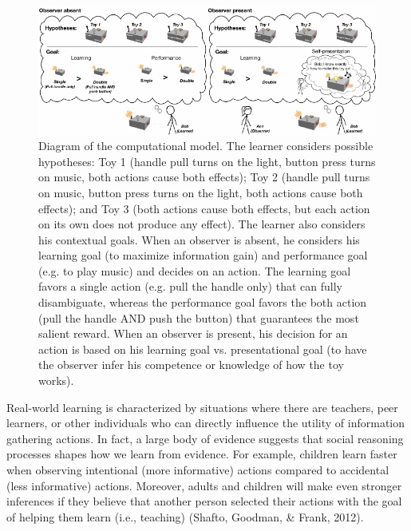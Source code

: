 \documentclass[10pt, letterpaper]{article}
\newenvironment{CodeChunk}{}{}
\begin{document}
\begin{CodeChunk}
\begin{figure}[tb]

{\centering \includegraphics[width=0.95\linewidth]{figs/model_diagram-1} 

}

\caption[Diagram of the computational model]{Diagram of the computational model. The learner considers possible hypotheses: Toy 1 (handle pull turns on the light, button press turns on music, both actions cause both effects); Toy 2 (handle pull turns on music, button press turns on the light, both actions cause both effects); and Toy 3 (both actions cause both effects, but each action on its own does not produce any effect). The learner also considers his contextual goals. When an observer is absent, he considers his learning goal (to maximize information gain) and performance goal (e.g. to play music) and decides on an action. The learning goal favors a single action (e.g. pull the handle only) that can fully disambiguate, whereas the performance goal favors the both action (pull the handle AND push the button) that guarantees the most salient reward. When an observer is present, his decision for an action is based on his learning goal vs. presentational goal (to have the observer infer his competence or knowledge of how the toy works).}\label{fig:model_diagram}
\end{figure}
\end{CodeChunk}

Real-world learning is characterized by situations where there are
teachers, peer learners, or other individuals who can directly influence
the utility of information gathering actions. In fact, a large body of
evidence suggests that social reasoning processes shapes how we learn
from evidence. For example, children learn faster when observing
intentional (more informative) actions compared to accidental (less
informative) actions. Moreover, adults and children will make even
stronger inferences if they believe that another person selected their
actions with the goal of helping them learn (i.e., teaching) (Shafto,
Goodman, \& Frank, 2012).
\end{document}
